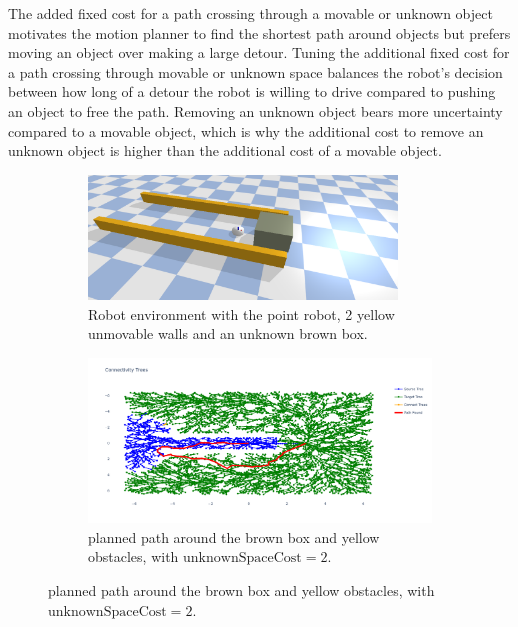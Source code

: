 The added fixed cost for a path crossing through a movable or unknown object motivates the motion planner to find the shortest path around objects but prefers moving an object over making a large detour. Tuning the additional fixed cost for a path crossing through movable or unknown space balances the robot's decision between how long of a detour the robot is willing to drive compared to pushing an object to free the path. Removing an unknown object bears more uncertainty compared to a movable object, which is why the additional cost to remove an unknown object is higher than the additional cost of a movable object. 

\begin{figure}[H]

    \centering
    \begin{subfigure}{\textwidth}
    \centering
    \includegraphics[width=0.9\textwidth]{figures/required_background/push_or_drive} \caption{Robot environment with the point robot, 2 yellow unmovable walls and an unknown brown box.}
    \end{subfigure}

    \begin{subfigure}{1.11\textwidth}
    \centering
    \includegraphics[width=\textwidth]{figures/required_background/mp/mp_high_fixed_cost}
    \caption{planned path around the brown box and yellow obstacles, with $\textrm{unknownSpaceCost} = 2$.}
    \end{subfigure}


\end{figure}
